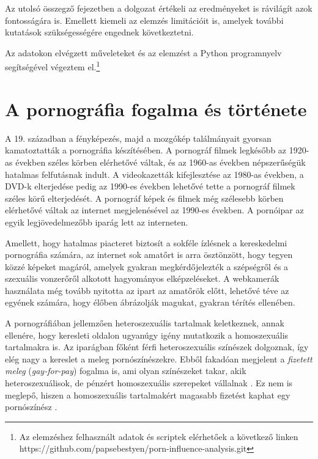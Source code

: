 \documentclass[12pt,a4paper]{article}
\begin{document}
Az utolsó összegző fejezetben a dolgozat értékeli az eredményeket is rávilágít azok fontosságára is. Emellett kiemeli az elemzés limitációit is, amelyek további kutatások szükségességére engednek következtetni.

Az adatokon elvégzett műveleteket és az elemzést a Python programnyelv segítségével végeztem el.\footnote{Az elemzéshez felhasznált adatok és scriptek elérhetőek a következő linken https://github.com/papsebestyen/porn-influence-analysis.git}

\section{A pornográfia fogalma és története}

A 19. században a fényképezés, majd a mozgókép találmányait gyorsan kamatoztatták a pornográfia készítésében. A pornográf filmek legkésőbb az 1920-as években széles körben elérhetővé váltak, és az 1960-as években népszerűségük hatalmas felfutásnak indult. A videokazetták kifejlesztése az 1980-as években, a DVD-k elterjedése pedig az 1990-es években lehetővé tette a pornográf filmek széles körű elterjedését. A pornográf képek és filmek még szélesebb körben elérhetővé váltak az internet megjelenésével az 1990-es években. A pornóipar az egyik legjövedelmezőbb iparág lett az interneten. \citep{jenkins2021_pornograpy}

Amellett, hogy hatalmas piacteret biztosít a sokféle ízlésnek a kereskedelmi pornográfia számára, az internet sok amatőrt is arra ösztönzött, hogy tegyen közzé képeket magáról, amelyek gyakran megkérdőjelezték a szépségről és a szexuális vonzerőről alkotott hagyományos elképzeléseket. A webkamerák használata még tovább nyitotta az ipart az amatőrök előtt, lehetővé téve az egyének számára, hogy élőben ábrázolják magukat, gyakran térítés ellenében. \citep{jenkins2021_pornograpy}

A pornográfiában jellemzően heteroszexuális tartalmak keletkeznek, annak ellenére, hogy keresleti oldalon ugyanúgy igény mutatkozik a homoszexuális tartalmakra is. Az iparágban főként férfi heteroszexuális színészek dolgoznak, így elég nagy a kereslet a meleg pornószínészekre. Ebből fakadóan megjelent a \textit{fizetett meleg} (\textit{gay-for-pay}) fogalma is, ami olyan színészeket takar, akik heteroszexuálisok, de pénzért homoszexuális szerepeket vállalnak \citep{kiss2019understanding}. Ez nem is meglepő, hiszen a homoszexuális tartalmakért magasabb fizetést kaphat egy pornószínész \citep{escoffier2003gay}.
\end{document}
